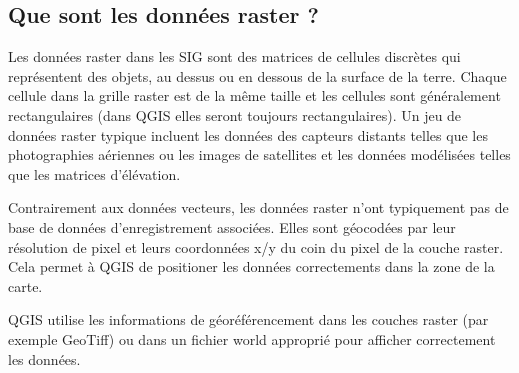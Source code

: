 \subsection{Que sont les données raster ?}\label{label_whatsraster}

Les données raster dans les SIG sont des matrices de cellules discrètes qui
représentent des objets, au dessus ou en dessous de la surface de la terre.
Chaque cellule dans la grille raster est de la même taille et les cellules sont
généralement rectangulaires (dans QGIS elles seront toujours rectangulaires).
Un jeu de données raster typique incluent les données des capteurs distants
telles que les photographies aériennes ou les images de satellites et les
données modélisées telles que les matrices d'élévation.

Contrairement aux données vecteurs, les données raster n'ont typiquement pas de
base de données d'enregistrement associées. Elles sont géocodées par leur
résolution de pixel et leurs coordonnées x/y du coin du pixel de la couche
raster. Cela permet à QGIS de positioner les données correctements dans la zone
de la carte.

QGIS utilise les informations de géoréférencement dans les couches raster (par
exemple GeoTiff) ou dans un fichier world approprié pour afficher correctement
les données.

